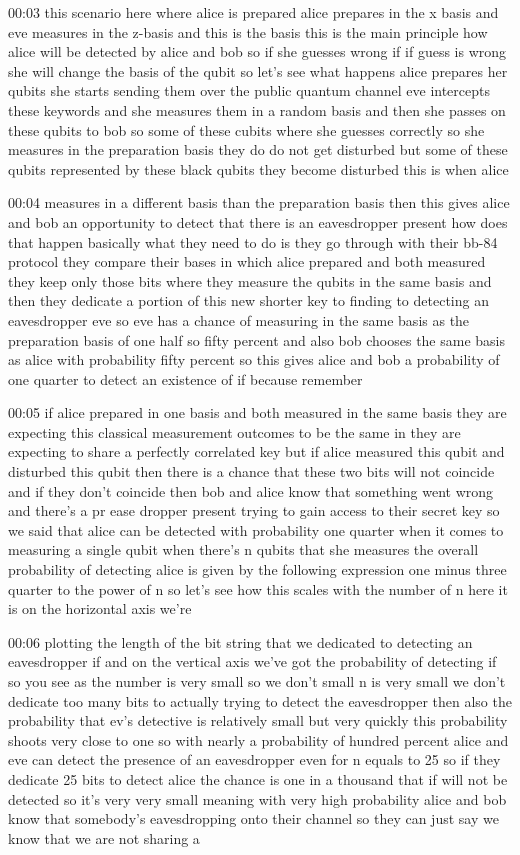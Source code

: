00:03
this scenario here where alice is prepared alice prepares in the x basis and eve
measures in the z-basis and this is the basis this is the main
principle how alice will be detected by alice and bob
so if she guesses wrong if if guess is wrong
she will change the basis of the qubit so let's see what happens alice prepares
her qubits she starts sending them over the public quantum channel
eve intercepts these keywords and she measures them in a random basis
and then she passes on these qubits to bob so some of these cubits where she
guesses correctly so she measures in the preparation basis
they do do not get disturbed but some of these qubits represented by
these black qubits they become disturbed this is when alice

00:04
measures in a different basis than the preparation basis
then this gives alice and bob an opportunity
to detect that there is an eavesdropper present how does that happen
basically what they need to do is they go through with their
bb-84 protocol they compare their bases in which alice prepared and both
measured they keep only those bits where they measure the qubits in
the same basis and then they dedicate a portion
of this new shorter key to finding to detecting an eavesdropper eve
so eve has a chance of measuring in the same basis as the preparation basis
of one half so fifty percent and also bob chooses the same basis as alice with
probability fifty percent so this gives alice and bob a
probability of one quarter to detect an existence of if because remember

00:05
if alice prepared in one basis and both measured in the same basis
they are expecting this classical measurement outcomes to be the same
in they are expecting to share a perfectly correlated key
but if alice measured this qubit and disturbed this qubit then there is a
chance that these two bits will not coincide and if they don't coincide then
bob and alice know that something went wrong and there's a pr
ease dropper present trying to gain access to their secret key
so we said that alice can be detected with probability one quarter
when it comes to measuring a single qubit when there's
n qubits that she measures the overall probability
of detecting alice is given by the following expression
one minus three quarter to the power of n so let's see how this scales with the
number of n here it is on the horizontal axis we're

00:06
plotting the length of the bit string that we dedicated to detecting
an eavesdropper if and on the vertical axis we've got the probability of
detecting if so you see as the number is very small so we don't
small n is very small we don't dedicate too many bits to actually trying to
detect the eavesdropper then also the probability that ev's
detective is relatively small but very quickly this probability shoots
very close to one so with nearly a probability of hundred percent alice
and eve can detect the presence of an eavesdropper
even for n equals to 25 so if they dedicate 25 bits to detect alice
the chance is one in a thousand that if will not be detected
so it's very very small meaning with very high probability alice and bob
know that somebody's eavesdropping onto their channel so
they can just say we know that we are not sharing a


